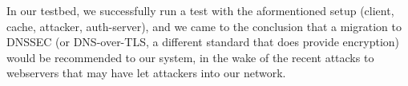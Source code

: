 \documentclass[paper=a4]{../../_global/texMemo}
\begin{document}
In our testbed, we successfully run a test with the aformentioned setup (client, cache, attacker, auth-server), and we came to the conclusion that a migration to DNSSEC (or DNS-over-TLS, a different standard that does provide encryption) would be recommended to our system, in the wake of the recent attacks to webservers that may have let attackers into our network.
\end{document}
